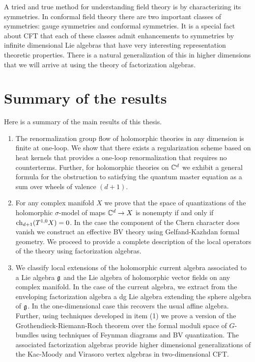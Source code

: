 A tried and true method for understanding field theory is by characterizing its symmetries. 
In conformal field theory there are two important classes of symmetries: gauge symmetries and conformal symmetries. 
It is a special fact about CFT that each of these classes admit enhancements to symmetries by infinite dimensional Lie algebras that have very interesting representation theoretic properties. 
There is a natural generalization of this in higher dimensions that we will arrive at using the theory of factorization algebras. 


\section{Summary of the results}

Here is a summary of the main results of this thesis.

\begin{enumerate}
\item The renormalization group flow of holomorphic theories in any dimension is finite at one-loop.
We show that there exists a regularization scheme based on heat kernels that provides a one-loop renormalization that requires no counterterms. 
Further, for holomorphic theories on $\mathbb C^d$ we exhibit a general formula for the obstruction to satisfying the quantum master equation as a sum over wheels of valence $(d+1)$. 

\item For any complex manifold $X$ we prove that the space of quantizations of the holomorphic $\sigma$-model of maps $\mathbb C^d \to X$ is nonempty if and only if ${\rm ch}_{d+1}(T^{1,0}X) = 0$. 
In the case the component of the Chern character does vanish we construct an effective BV theory using Gelfand-Kazhdan formal geometry.
We proceed to provide a complete description of the local operators of the theory using factorization algebras.

\item We classify local extensions of the holomorphic current algebra associated to a Lie algebra $\mathfrak g$ and the Lie algebra of holomorphic vector fields on any complex manifold.
In the case of the current algebra, we extract from the enveloping factorization algebra a dg Lie algebra extending the sphere algebra of $\mathfrak g$.
In the one-dimensional case this recovers the usual affine algebra.
Further, using techniques developed in item (1) we prove a version of the Grothendieck-Riemann-Roch theorem over the formal moduli space of $G$-bundles using techniques of Feynman diagrams and BV quantization.
The associated factorization algebras provide higher dimensional generalizations of the Kac-Moody and Virasoro vertex algebras in two-dimensional CFT. 

\end{enumerate}

